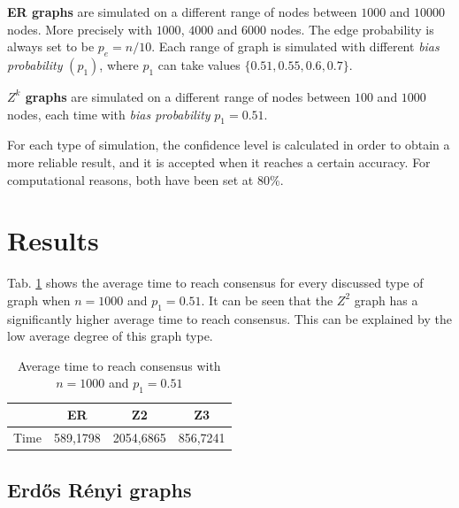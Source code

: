 \documentclass[conference]{IEEEtran}
\begin{document}
    \textbf{ER graphs} are simulated on a different range of nodes between $1000$ and $10000$ nodes. More precisely with $1000$, $4000$ and $6000$ nodes.
    The edge probability is always set to be $p_e = n/10$.
    Each range of graph is simulated with different \textit{bias probability} $(p_1)$, where $p_1$ can take values $\{0.51, 0.55, 0.6, 0.7\}$.

    \textbf{$Z^k$ graphs} are simulated on a different range of nodes between $100$ and $1000$ nodes, each time with \textit{bias probability} $p_1 = 0.51$.

    For each type of simulation, the confidence level is calculated in order to obtain a more reliable result, and it is accepted when it reaches a certain accuracy.
    For computational reasons, both have been set at 80\%.

\section{Results}

    Tab. \ref{tab:all_graphs} shows the average time to reach consensus for every discussed type of graph when $n = 1000$ and $p_1 = 0.51$.
    It can be seen that the $Z^2$ graph has a significantly higher average time to reach consensus. This can be explained by the low average degree of this graph type. 

    \begin{table}[!ht]
        \centering
        \caption{Average time to reach consensus with $n = 1000$ and $p_1=0.51$}
        \label{tab:all_graphs}
        \begin{tabular}{|c|c|c|c|}
        \hline
                & ER       & Z2        & Z3       \\ \hline
        Time & 589,1798 & 2054,6865 & 856,7241 \\ \hline
        \end{tabular}
    \end{table}
    

    \subsection{Erdős Rényi graphs} 
\end{document}
